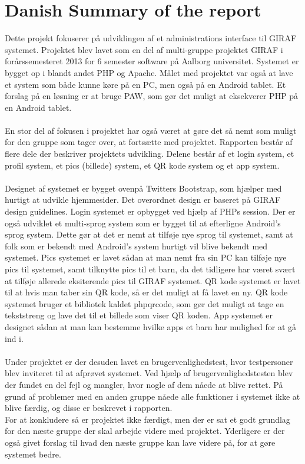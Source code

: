\section{Danish Summary of the report}
Dette projekt fokuserer på udviklingen af et administrations interface til GIRAF systemet. Projektet blev lavet som en del af multi-gruppe projektet GIRAF i forårssemesteret 2013 for 6 semester software på Aalborg universitet. Systemet er bygget op i blandt andet PHP og Apache. Målet med projektet var også at lave et system som både kunne køre på en PC, men også på en Android tablet. Et forslag på en løsning er at bruge PAW, som gør det muligt at eksekverer PHP på en Android tablet. \\ \\
En stor del af fokusen i projektet har også været at gøre det så nemt som muligt for den gruppe som tager over, at fortsætte med projektet. Rapporten består af flere dele der beskriver projektets udvikling. Delene består af et login system, et profil system, et pics (billede) system, et QR kode system og et app system. \\ \\
Designet af systemet er bygget ovenpå Twitters Bootstrap, som hjælper med hurtigt at udvikle hjemmesider. Det overordnet design er baseret på GIRAF design guidelines. Login systemet er opbygget ved hjælp af PHPs session. Der er også udviklet et multi-sprog system som er bygget til at efterligne Android's sprog system. Dette gør at det er nemt at tilføje nye sprog til systemet, samt at folk som er bekendt med Android's system hurtigt vil blive bekendt med systemet. Pics systemet er lavet sådan at man nemt fra sin PC kan tilføje nye pics til systemet, samt tilknytte pics til et barn, da det tidligere har været svært at tilføje allerede eksiterende pics til GIRAF systemet. QR kode systemet er lavet til at hvis man taber sin QR kode, så er det muligt at få lavet en ny. QR kode systemet bruger et bibliotek kaldet phpqrcode, som gør det muligt at tage en tekststreng og lave det til et billede som viser QR koden. App systemet er designet sådan at man kan bestemme hvilke apps et barn har mulighed for at gå ind i. \\ \\
Under projektet er der desuden lavet en brugervenlighedstest, hvor testpersoner blev inviteret til at afprøvet systemet. Ved hjælp af brugervenlighedstesten blev der fundet en del fejl og mangler, hvor nogle af dem nåede at blive rettet. På grund af problemer med en anden gruppe nåede alle funktioner i systemet ikke at blive færdig, og disse er beskrevet i rapporten. \\
For at konkludere så er projektet ikke færdigt, men der er sat et godt grundlag for den næste gruppe der skal arbejde videre med projektet. Yderligere er der også givet forslag til hvad den næste gruppe kan lave videre på, for at gøre systemet bedre.